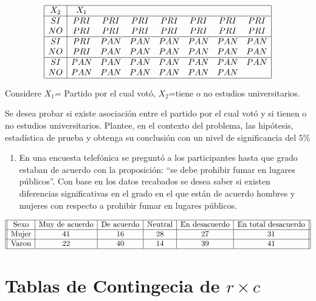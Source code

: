 \documentclass[
  a4paper,
  oneside,
  openany]{book}
\providecommand{\tightlist}{%
  \setlength{\itemsep}{0pt}\setlength{\parskip}{0pt}}
\begin{document}
\[
\begin{array}{|c|c c c c c c c|}
\hline
X_{2}&X_{1}&&&&&&\\
 \hline
SI & PRI & PRI & PRI & PRI & PRI & PRI & PRI\\
NO & PRI & PRI & PRI & PRI & PRI & PRI & PRI\\
 \hline
SI & PRI & PAN & PAN & PAN & PAN & PAN &PAN\\
NO & PRI & PAN & PAN & PAN & PAN & PAN & PAN\\
 \hline
SI & PAN & PAN & PAN & PAN & PAN & PAN & PAN\\
NO & PAN & PAN & PAN & PAN & PAN & PAN&\\
 \hline
\end{array}
\]

Considere \(X_{1}\)= Partido por el cual votó, \(X_{2}\)=tiene o no estudios universitarios.

Se desea probar si existe asociación entre el partido por el cual votó y si tienen o no estudios universitarios. Plantee, en el contexto del problema, las hipótesis, estadística de prueba y obtenga su conclusión con un nivel de significancia del \(5\%\)

\begin{enumerate}
\def\labelenumi{\arabic{enumi}.}
\setcounter{enumi}{2}
\tightlist
\item
  En una encuesta telefónica se preguntó a los participantes hasta que grado estaban de acuerdo
  con la proposición: ``se debe prohibir fumar en lugares públicos''. Con base en los datos recabados se desea saber si existen diferencias significativas en el grado en el que están de acuerdo hombres y mujeres con respecto a prohibir fumar en lugares públicos.
\end{enumerate}

\[
\begin{array}{||c |c |c |c| c | c ||}
\hline 
\mbox{Sexo} & \mbox{Muy de acuerdo}& \mbox{De acuerdo} & \mbox{Neutral} & \mbox{En desacuerdo} &  \mbox{En total desacuerdo}\\
\hline 
\mbox{Mujer} & 41 &  16 & 28 & 27 & 31\\
 \hline 
\mbox{Varon} & 22 & 40 & 14 & 39 & 41 \\
\hline 
\end{array}
\]

\hypertarget{tablas-de-contingecia-de-r-times-c}{%
\chapter{\texorpdfstring{Tablas de Contingecia de \(r \times c\)}{Tablas de Contingecia de r \textbackslash times c}}\label{tablas-de-contingecia-de-r-times-c}}
\end{document}
